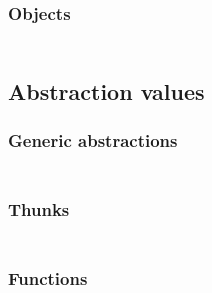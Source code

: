 \subsubsection*{Objects}\hypertarget{objects}{}\label{objects}

\begin{align*}
  [ ~ 
  \KEY{Datatype} ~ & \NAMEHYPER{../../../../../Funcons-beta/Values/Composite}{Objects}{objects} \\
  \KEY{Funcon} ~ & \NAMEHYPER{../../../../../Funcons-beta/Values/Composite}{Objects}{object} \\
  \KEY{Funcon} ~ & \NAMEHYPER{../../../../../Funcons-beta/Values/Composite}{Objects}{object-class-name} \\
  \KEY{Funcon} ~ & \NAMEHYPER{../../../../../Funcons-beta/Values/Composite}{Objects}{object-single-inheritance-feature-map}
  ~ ]
\end{align*}
\subsection*{Abstraction values}\hypertarget{abstraction-values}{}\label{abstraction-values}

\subsubsection*{Generic abstractions}\hypertarget{generic-abstractions}{}\label{generic-abstractions}

\begin{align*}
  [ ~ 
  \KEY{Funcon} ~ & \NAMEHYPER{../../../../../Funcons-beta/Values/Abstraction}{Generic}{abstraction} \\
  \KEY{Funcon} ~ & \NAMEHYPER{../../../../../Funcons-beta/Values/Abstraction}{Generic}{closure}
  ~ ]
\end{align*}
\subsubsection*{Thunks}\hypertarget{thunks}{}\label{thunks}

\begin{align*}
  [ ~ 
  \KEY{Funcon} ~ & \NAMEHYPER{../../../../../Funcons-beta/Values/Abstraction}{Thunks}{thunk} \\
  \KEY{Funcon} ~ & \NAMEHYPER{../../../../../Funcons-beta/Values/Abstraction}{Thunks}{force}
  ~ ]
\end{align*}
\subsubsection*{Functions}\hypertarget{functions}{}\label{functions}

